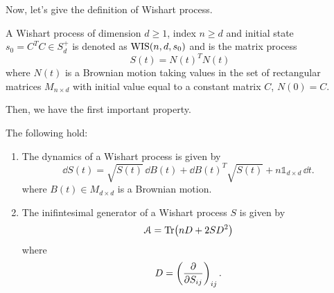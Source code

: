 Now, let's give the definition of Wishart process.
\begin{definition} %
    A Wishart process of dimension $d\ge1$, index $n\ge d$ and initial state $s_0 = C^TC \in S^+_d$ is denoted as $\operatorname{WIS}(n,d,s_0)$ and is the matrix process
    \begin{equation}
        S(t) = N(t)^TN(t)
    \end{equation}
    where $N(t)$ is a Brownian motion taking values in the set of rectangular matrices $M_{n\times d}$ with initial value equal to a constant matrix $C$, $N(0) = C$.
\end{definition}
Then, we have the first important property.
\begin{theorem}
    The following hold:
    \begin{enumerate}
        \item The dynamics of a Wishart process is given by
        \begin{equation}
            \dd S(t) = \sqrt{S(t)}\,\dd B(t) + \dd B(t)^T\sqrt{S(t)} + n\mathds{1}_{d\times d}\,\dd t.
        \end{equation}
        where $B(t) \in M_{d\times d}$ is a Brownian motion.
        \item The inifintesimal generator of a Wishart process $S$ is given by
        \begin{equation}
            \mathcal{A} = \Tr(nD + 2SD^2)
        \end{equation}
        where
        \begin{equation*}
            D = \left(\pdv{}{S_{ij}}\right)_{ij}.
        \end{equation*}
    \end{enumerate}
\end{theorem}

